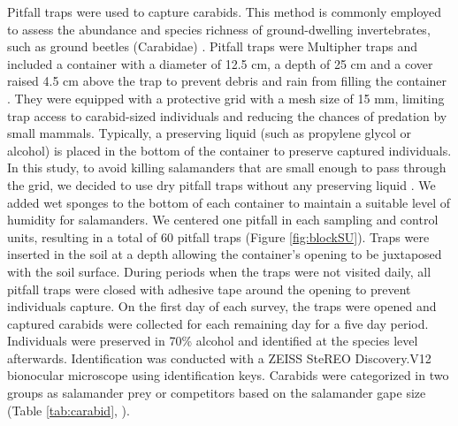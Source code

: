 Pitfall traps were used to capture carabids.
This method is commonly employed to assess the abundance and species richness of ground-dwelling invertebrates, such as ground beetles (Carabidae) \citep{baarsCatchesPitfallTraps1979,knappEffectPitfallTrap2012,kotzeFortyYearsCarabid2011a,loveiEcologyBehaviorGround1996,spenceSamplingCarabidAssemblages1994a}. 
Pitfall traps were Multipher\up{\textregistered{}} traps and included a container with a diameter of 12.5 cm, a depth of 25 cm and a cover raised 4.5 cm above the trap 
to prevent debris and rain from filling the container \citep{bouchardBeetleCommunityResponse2016b,Jobin1988MultiPherinsect,mooreEffectsTwoSilvicultural2004}.
They were equipped with a protective grid with a mesh size of 15 mm, limiting trap access to carabid-sized individuals and reducing the chances of predation by small mammals. 
Typically, a preserving liquid (such as propylene glycol or alcohol) is placed in the bottom of the container to preserve captured individuals. 
In this study, to avoid killing salamanders that are small enough to pass through the grid, we decided to use dry pitfall traps without any preserving liquid \citep{luffFeaturesInfluencingEfficiency1975}. 
We added wet sponges to the bottom of each container to maintain a suitable level of humidity for salamanders.
We centered one pitfall in each sampling and control units, resulting in a total of 60 pitfall traps (Figure \ref{fig:blockSU}). 
Traps were inserted in the soil at a depth allowing the container's opening to be juxtaposed with the soil surface. 
During periods when the traps were not visited daily, all pitfall traps were closed with adhesive tape around the opening to prevent individuals capture. 
On the first day of each survey, the traps were opened and captured carabids were collected for each remaining day for a five day period. 
Individuals were preserved in 70\% alcohol and identified at the species level afterwards.
Identification was conducted with a ZEISS SteREO Discovery.V12 bionocular microscope using \cite{larochelleManuelIdentificationCarabidae1976} identification keys.
Carabids were categorized in two groups as salamander prey or competitors based on the salamander gape size (Table \ref{tab:carabid}, \citealp{jaegerFoodLimitedResource1972,magliaModulationPreycaptureBehavior1995,magliaOntogenyFeedingEcology1996}).

